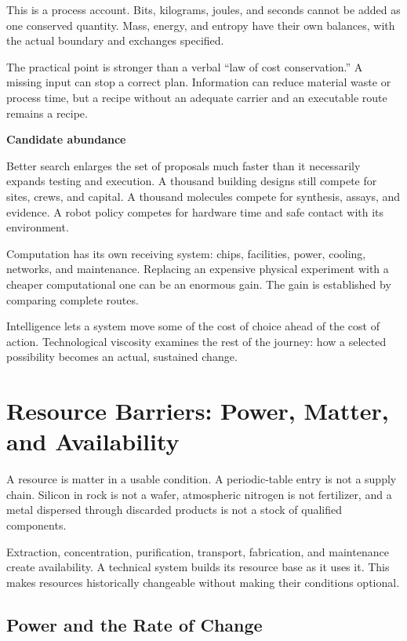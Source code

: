 \documentclass[11pt,openany]{book}
\newcommand{\subhead}[1]{\par\medskip\noindent\textbf{#1}\par\nobreak\smallskip}
\begin{document}
This is a process account. Bits, kilograms, joules, and seconds cannot be added as one conserved quantity. Mass, energy, and entropy have their own balances, with the actual boundary and exchanges specified.

The practical point is stronger than a verbal “law of cost conservation.” A missing input can stop a correct plan. Information can reduce material waste or process time, but a recipe without an adequate carrier and an executable route remains a recipe.

\subhead{Candidate abundance}

Better search enlarges the set of proposals much faster than it necessarily expands testing and execution. A thousand building designs still compete for sites, crews, and capital. A thousand molecules compete for synthesis, assays, and evidence. A robot policy competes for hardware time and safe contact with its environment.

Computation has its own receiving system: chips, facilities, power, cooling, networks, and maintenance. Replacing an expensive physical experiment with a cheaper computational one can be an enormous gain. The gain is established by comparing complete routes.

Intelligence lets a system move some of the cost of choice ahead of the cost of action. Technological viscosity examines the rest of the journey: how a selected possibility becomes an actual, sustained change.

\section{Resource Barriers: Power, Matter, and Availability}

A resource is matter in a usable condition. A periodic-table entry is not a supply chain. Silicon in rock is not a wafer, atmospheric nitrogen is not fertilizer, and a metal dispersed through discarded products is not a stock of qualified components.

Extraction, concentration, purification, transport, fabrication, and maintenance create availability. A technical system builds its resource base as it uses it. This makes resources historically changeable without making their conditions optional.

\subsection{Power and the Rate of Change}
\end{document}
